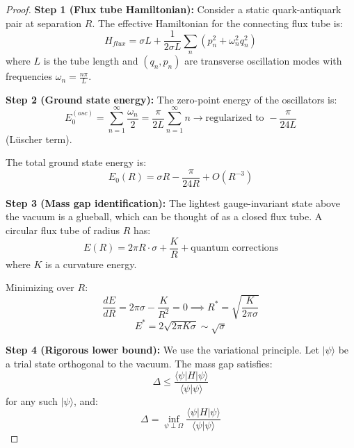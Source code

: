 \begin{proof}
\textbf{Step 1 (Flux tube Hamiltonian):}
Consider a static quark-antiquark pair at separation $R$. The effective Hamiltonian for the connecting flux tube is:
\begin{equation}
H_{flux} = \sigma L + \frac{1}{2\sigma L} \sum_n \left(p_n^2 + \omega_n^2 q_n^2\right)
\end{equation}
where $L$ is the tube length and $(q_n, p_n)$ are transverse oscillation modes with frequencies $\omega_n = \frac{n\pi}{L}$.

\textbf{Step 2 (Ground state energy):}
The zero-point energy of the oscillators is:
\begin{equation}
E_0^{(osc)} = \sum_{n=1}^\infty \frac{\omega_n}{2} = \frac{\pi}{2L} \sum_{n=1}^\infty n \to \text{regularized to } -\frac{\pi}{24L}
\end{equation}
(Lüscher term).

The total ground state energy is:
\begin{equation}
E_0(R) = \sigma R - \frac{\pi}{24R} + O(R^{-3})
\end{equation}

\textbf{Step 3 (Mass gap identification):}
The lightest gauge-invariant state above the vacuum is a glueball, which can be thought of as a closed flux tube. A circular flux tube of radius $R$ has:
\begin{equation}
E(R) = 2\pi R \cdot \sigma + \frac{K}{R} + \text{quantum corrections}
\end{equation}
where $K$ is a curvature energy.

Minimizing over $R$:
\begin{equation}
\frac{dE}{dR} = 2\pi \sigma - \frac{K}{R^2} = 0 \implies R^* = \sqrt{\frac{K}{2\pi\sigma}}
\end{equation}
\begin{equation}
E^* = 2\sqrt{2\pi K \sigma} \sim \sqrt{\sigma}
\end{equation}

\textbf{Step 4 (Rigorous lower bound):}
We use the variational principle. Let $|\psi\rangle$ be a trial state orthogonal to the vacuum. The mass gap satisfies:
\begin{equation}
\Delta \leq \frac{\langle \psi | H | \psi \rangle}{\langle \psi | \psi \rangle}
\end{equation}
for any such $|\psi\rangle$, and:
\begin{equation}
\Delta = \inf_{\psi \perp \Omega} \frac{\langle \psi | H | \psi \rangle}{\langle \psi | \psi \rangle}
\end{equation}


\end{proof}
